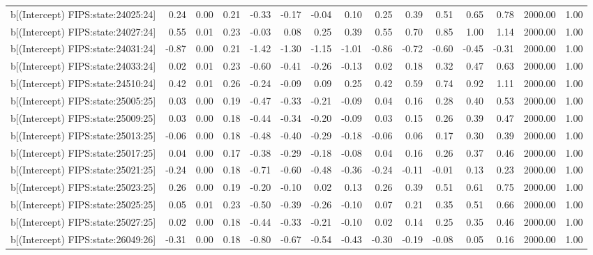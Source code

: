 \begin{table}[ht]
\begin{tabular}{rrrrrrrrrrrrrrr}
  b[(Intercept) FIPS:state:24025:24] & 0.24 & 0.00 & 0.21 & -0.33 & -0.17 & -0.04 & 0.10 & 0.25 & 0.39 & 0.51 & 0.65 & 0.78 & 2000.00 & 1.00 \\ 
  b[(Intercept) FIPS:state:24027:24] & 0.55 & 0.01 & 0.23 & -0.03 & 0.08 & 0.25 & 0.39 & 0.55 & 0.70 & 0.85 & 1.00 & 1.14 & 2000.00 & 1.00 \\ 
  b[(Intercept) FIPS:state:24031:24] & -0.87 & 0.00 & 0.21 & -1.42 & -1.30 & -1.15 & -1.01 & -0.86 & -0.72 & -0.60 & -0.45 & -0.31 & 2000.00 & 1.00 \\ 
  b[(Intercept) FIPS:state:24033:24] & 0.02 & 0.01 & 0.23 & -0.60 & -0.41 & -0.26 & -0.13 & 0.02 & 0.18 & 0.32 & 0.47 & 0.63 & 2000.00 & 1.00 \\ 
  b[(Intercept) FIPS:state:24510:24] & 0.42 & 0.01 & 0.26 & -0.24 & -0.09 & 0.09 & 0.25 & 0.42 & 0.59 & 0.74 & 0.92 & 1.11 & 2000.00 & 1.00 \\ 
  b[(Intercept) FIPS:state:25005:25] & 0.03 & 0.00 & 0.19 & -0.47 & -0.33 & -0.21 & -0.09 & 0.04 & 0.16 & 0.28 & 0.40 & 0.53 & 2000.00 & 1.00 \\ 
  b[(Intercept) FIPS:state:25009:25] & 0.03 & 0.00 & 0.18 & -0.44 & -0.34 & -0.20 & -0.09 & 0.03 & 0.15 & 0.26 & 0.39 & 0.47 & 2000.00 & 1.00 \\ 
  b[(Intercept) FIPS:state:25013:25] & -0.06 & 0.00 & 0.18 & -0.48 & -0.40 & -0.29 & -0.18 & -0.06 & 0.06 & 0.17 & 0.30 & 0.39 & 2000.00 & 1.00 \\ 
  b[(Intercept) FIPS:state:25017:25] & 0.04 & 0.00 & 0.17 & -0.38 & -0.29 & -0.18 & -0.08 & 0.04 & 0.16 & 0.26 & 0.37 & 0.46 & 2000.00 & 1.00 \\ 
  b[(Intercept) FIPS:state:25021:25] & -0.24 & 0.00 & 0.18 & -0.71 & -0.60 & -0.48 & -0.36 & -0.24 & -0.11 & -0.01 & 0.13 & 0.23 & 2000.00 & 1.00 \\ 
  b[(Intercept) FIPS:state:25023:25] & 0.26 & 0.00 & 0.19 & -0.20 & -0.10 & 0.02 & 0.13 & 0.26 & 0.39 & 0.51 & 0.61 & 0.75 & 2000.00 & 1.00 \\ 
  b[(Intercept) FIPS:state:25025:25] & 0.05 & 0.01 & 0.23 & -0.50 & -0.39 & -0.26 & -0.10 & 0.07 & 0.21 & 0.35 & 0.51 & 0.66 & 2000.00 & 1.00 \\ 
  b[(Intercept) FIPS:state:25027:25] & 0.02 & 0.00 & 0.18 & -0.44 & -0.33 & -0.21 & -0.10 & 0.02 & 0.14 & 0.25 & 0.35 & 0.46 & 2000.00 & 1.00 \\ 
  b[(Intercept) FIPS:state:26049:26] & -0.31 & 0.00 & 0.18 & -0.80 & -0.67 & -0.54 & -0.43 & -0.30 & -0.19 & -0.08 & 0.05 & 0.16 & 2000.00 & 1.00 \\ 

\end{tabular}
\end{table}
